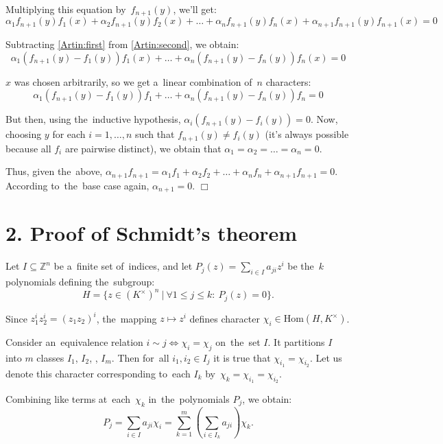 \documentclass[twoside]{article}
\begin{document}
    Multiplying this equation by~$f_{n + 1}(y)$, we'll get:
    \begin{equation}\label{Artin:second}
        \alpha_1 f_{n + 1}(y) f_1(x) + \alpha_2 f_{n + 1}(y) f_2(x) + \ldots + \alpha_n f_{n + 1}(y) f_n(x) + \alpha_{n + 1} f_{n + 1}(y) f_{n + 1}(x) = 0
    \end{equation}

    Subtracting \eqref{Artin:first} from \eqref{Artin:second}, we obtain:
    $$
        \alpha_1 (f_{n + 1}(y) - f_1(y)) f_1(x) + \ldots + \alpha_n (f_{n + 1}(y) - f_n(y)) f_n(x) = 0
    $$

    $x$ was chosen arbitrarily, so we get a~linear combination of~$n$ characters:
    $$
        \alpha_1 (f_{n + 1}(y) - f_1(y)) f_1 + \ldots + \alpha_n (f_{n + 1}(y) - f_n(y)) f_n = 0
    $$

    But then, using the~inductive hypothesis, $\alpha_i (f_{n + 1}(y) - f_i(y)) = 0$. Now, choosing $y$
    for each $i = 1, \ldots, n$ such that $f_{n + 1}(y) \neq f_i(y)$ (it's always possible because all $f_i$
    are pairwise distinct), we obtain that $\alpha_1 = \alpha_2 = \ldots = \alpha_n = 0$.

    Thus, given the~above, $\alpha_{n + 1} f_{n + 1} = \alpha_1 f_1 + \alpha_2 f_2 + \ldots + \alpha_n f_n + \alpha_{n + 1} f_{n + 1} = 0$.
    According to~the~base case again, $\alpha_{n + 1} = 0$.
\hfill$\Box$

\section*{2. Proof of Schmidt's theorem}

    Let $I \subseteq \mathbb{Z}^n$ be a~finite set of~indices, and let $P_j(z) = \sum_{i \in I} a_{ji} z^i$ be the~$k$ polynomials
    defining the~subgroup:
    $$
        H = \{ z \in (K^{\times})^n\ |\ \forall 1 \leq j \leq k{:}\ P_j(z) = 0 \}.
    $$

    Since $z_1^{i} z_2^{i} = (z_1 z_2)^i$, the~mapping $z \mapsto z^i$ defines character $\chi_i \in \mathrm{Hom}(H, K^{\times})$.

    Consider an~equivalence relation $i \sim j \Leftrightarrow \chi_i = \chi_j$ on~the~set $I$. It partitions $I$
    into $m$ classes $I_1$, $I_2$, \textellipsis, $I_m$. Then for~all $i_1, i_2 \in I_j$ it is true that $\chi_{i_1} = \chi_{i_2}$.
    Let us denote this character corresponding to~each $I_k$ by~$\chi_k = \chi_{i_1} = \chi_{i_2}$.

    Combining like terms at~each~$\chi_k$ in~the~polynomials $P_j$, we obtain:
    $$
        P_j = \sum_{i \in I} a_{ji} \chi_i = \sum_{k = 1}^{m} \left( \sum_{i \in I_k} a_{ji} \right) \chi_k.
    $$
\end{document}
